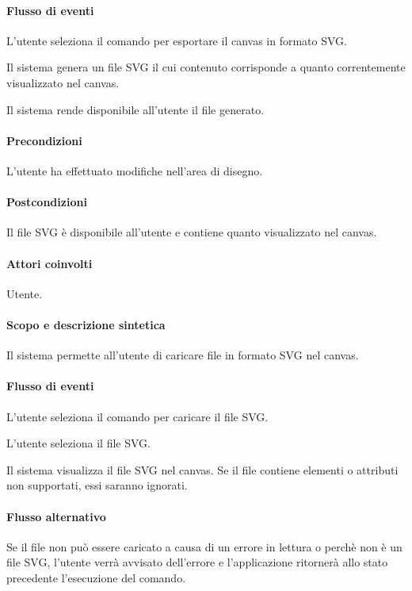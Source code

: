 \paragraph{Flusso di eventi}
\begin{elenconumerato}[\textbf{}]{\subsubsecindent}
\item L'utente seleziona il comando per esportare il canvas in formato SVG.
\item Il sistema genera un file SVG il cui contenuto corrisponde a quanto correntemente visualizzato nel canvas.
\item Il sistema rende disponibile all'utente il file generato.
\end{elenconumerato}
\paragraph{Precondizioni} L'utente ha effettuato modifiche nell'area di disegno.
\paragraph{Postcondizioni} Il file SVG \`e disponibile all'utente e contiene quanto visualizzato nel canvas.

\paragraph{Attori coinvolti} Utente.
\paragraph{Scopo e descrizione sintetica} 
Il sistema permette all'utente di caricare file in formato SVG nel canvas.
\paragraph{Flusso di eventi}
\begin{elenconumerato}[\textbf{}]{\subsubsecindent}
\item L'utente seleziona il comando per caricare il file SVG.
\item L'utente seleziona il file SVG.
\item Il sistema visualizza il file SVG nel canvas. Se il file contiene elementi o attributi non supportati, essi saranno ignorati.
\end{elenconumerato}
\paragraph{Flusso alternativo}
Se il file non pu\`o essere caricato a causa di un errore in lettura o perch\`e non \`e un file SVG, l'utente verr\`a avvisato dell'errore e l'applicazione ritorner\`a allo stato precedente l'esecuzione del comando.
